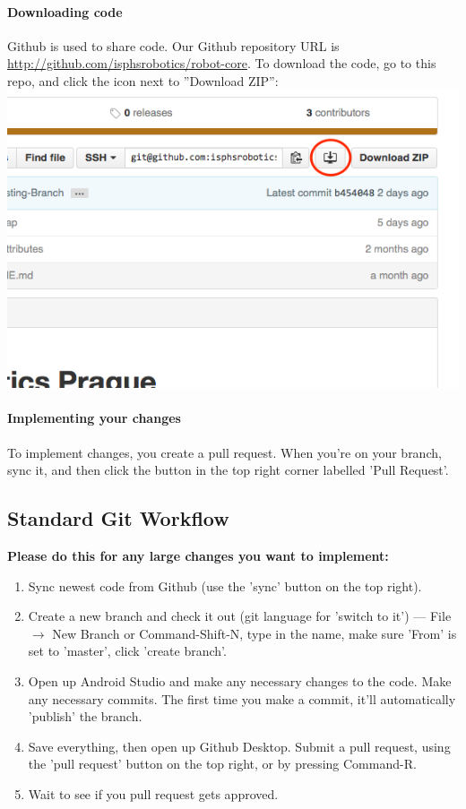 \documentclass[12p,a4paper]{article}
\begin{document}
\paragraph{Downloading code}Github is used to share code. Our Github repository URL is \url{http://github.com/isphsrobotics/robot-core}. To download the code, go to this repo, and click the icon next to ''Download ZIP'':\\
\includegraphics[scale=0.6]{download-repo}
\paragraph{Implementing your changes}To implement changes, you create a pull request. When you're on your branch, sync it, and then click the button in the top right corner labelled 'Pull Request'.
\pagebreak
\subsection{Standard Git Workflow}
\textbf{Please do this for any large changes you want to implement:}

\begin{enumerate}
\item{Sync newest code from Github (use the 'sync' button on the top right).}
\item{Create a new branch and check it out (git language for 'switch to it') --- File $\rightarrow$ New Branch or Command-Shift-N, type in the name, make sure 'From' is set to 'master', click 'create branch'.}
\item{Open up Android Studio and make any necessary changes to the code. Make any necessary commits. The first time you make a commit, it'll automatically 'publish' the branch.}
\item{Save everything, then open up Github Desktop. Submit a pull request, using the 'pull request' button on the top right, or by pressing Command-R.}
\item{Wait to see if you pull request gets approved.}
\end{enumerate}
\end{document}
